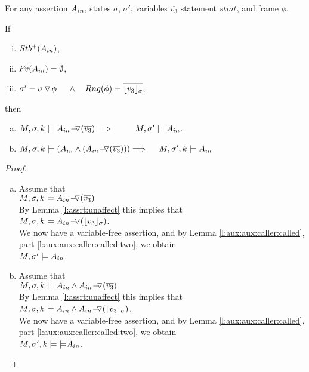 \begin{lemma}
\label{l:calls:external}

For any assertion $A_{in}$, states $\sigma$, $\sigma'$,  
variables   $\overline{v_3}$  
statement $stmt$, and frame $\phi$.

\noindent
If 
\begin{enumerate}[(i)]
\item 
\label{l:calls:ext:re:one}
$ {Stb^+( A_{in} )}$,  
\item 
\label{l:callsext:re:two}
${\hspace{-1pt}F\hspace{-1pt}}v(A_{in}) =  \emptyset$,
\item
\label{l:calls:ext:re:three}
$\sigma'=\sigma  \pushSymbol \phi  \ \ \ \  \wedge\ \ \  Rng(\phi)= \overline{\interpret {\sigma} {v_3} },$
\end{enumerate}

\noindent
then

\begin{enumerate}[a.]
\item
\label{l:calls:callee:three}
$ \satDAssertFrom M  \sigma k    {\PushASLong  {(\overline {v_3})} {\Ain} }  \hfill \Longrightarrow  \ \ \  \   \ \ \  \   M, \sigma' \models   {\Ain} $.
 
\item
\label{l:calls:callee:four}
$\satDAssertFrom M  \sigma k    {(\Ain  \wedge  ({\PushASLong  {(\overline {v_3})} {\Ain} } ) )}    \hfill \Longrightarrow  \ \ \  \   \satDAssertFrom M  {\sigma'} k  {\Ain}$

\end{enumerate}

\end{lemma}

\begin{proof}
\begin{enumerate}[a.]
\item
Assume that \\
$ M,\sigma ,{k} \models {\ensuremath{ A_{in} \!-\!\!\!\,\!{\triangledown} (\overline {v_3})} } $\\
	By Lemma \ref{l:assrt:unaffect}    this  implies that \\
$ M,\sigma ,{k} \models {\ensuremath{ A_{in} \!-\!\!\!\,\!{\triangledown} (\lfloor v_3 \rfloor_{\sigma})} } $.\\
We now have a variable-free assertion, and by Lemma \ref{l:aux:aux:caller:called}, part \ref{l:aux:aux:caller:called:two}, we obtain\\
$ M,  \sigma'    \models A_{in}$.
\item
Assume that \\
$ M,\sigma ,{k} \models {A_{in}\wedge \ensuremath{ A_{in} \!-\!\!\!\,\!{\triangledown} (\overline {v_3})} } $\\
	By Lemma \ref{l:assrt:unaffect}    this  implies that \\
$ M,\sigma ,{k} \models {A_{in}\wedge \ensuremath{ A_{in} \!-\!\!\!\,\!{\triangledown} (\lfloor v_3 \rfloor_{\sigma})} } $.\\
We now have a variable-free assertion, and by Lemma \ref{l:aux:aux:caller:called}, part \ref{l:aux:aux:caller:called:two}, we obtain\\
$ M,\sigma' ,{k} \models {\models}  A_{in}$.
\end{enumerate}

\end{proof}

